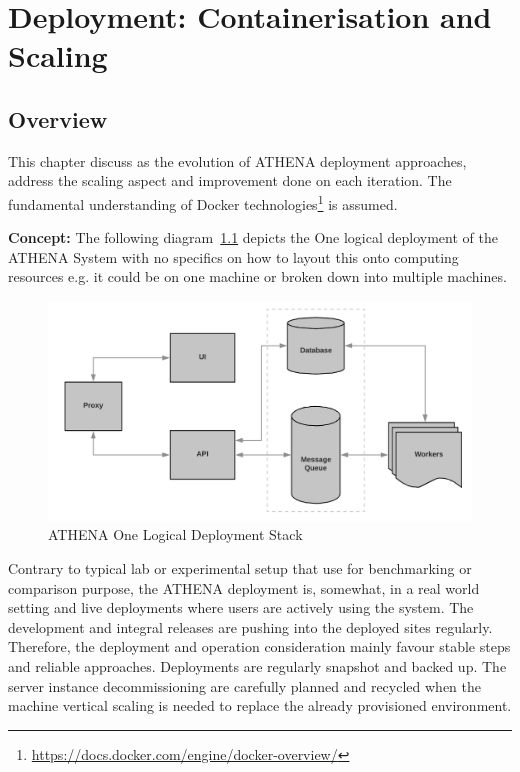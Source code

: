 \chapter{Deployment: Containerisation and Scaling}

\label{Chapter3}

\section{Overview}
This chapter discuss as the evolution of ATHENA deployment approaches, address the scaling aspect and improvement done on each iteration. The fundamental understanding of Docker technologies\footnote{\url{https://docs.docker.com/engine/docker-overview/}} is assumed.

\noindent \textbf{Concept:} \quad The following diagram~\ref{fig:deployStack} depicts the One logical deployment of the ATHENA System with no specifics on how to layout this onto computing resources e.g. it could be on one machine or broken down into multiple machines.

\begin{figure}[H]
\centering
\includegraphics[width=0.5\paperwidth]{Figures/ATHENA_deploy_stack}
\decoRule
\caption[ATHENA Deployment Stack]{ATHENA One Logical Deployment Stack}
\label{fig:deployStack}
\end{figure}

Contrary to typical lab or experimental setup that use for benchmarking or comparison purpose, the ATHENA deployment is, somewhat, in a real world setting and live deployments where users are actively using the system. The development and integral releases are pushing into the deployed sites regularly. Therefore, the deployment and operation consideration mainly favour stable steps and reliable approaches. Deployments are regularly snapshot and backed up. The server instance decommissioning are carefully planned and recycled when the machine vertical scaling is needed to replace the already provisioned environment. 

